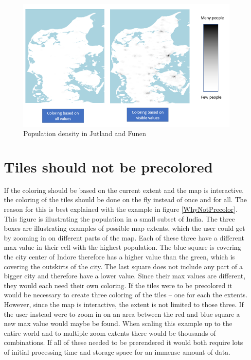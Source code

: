 \begin{figure} [H]
	\centering
	\includegraphics[width=.8\textwidth]{Pictures/WhyLimitToExtent}
	\caption{Population density in Jutland and Funen}
	\label{WhyLimitToExtent}
\end{figure}


\section{Tiles should not be precolored}
If the coloring should be based on the current extent and the map is interactive, the coloring of the tiles should be done on the fly instead of once and for all. The reason for this is best explained with the example in figure \ref{WhyNotPrecolor}. This figure is illustrating the population in a small subset of India.  The three boxes are illustrating examples of possible map extents, which the user could get by zooming in on different parts of the map. Each of these three have a different max value in their cell with the highest population. The blue square is covering the city center of Indore therefore has a higher value than the green, which is covering the outskirts of the city. The last square does not include any part of a bigger city and therefore have a lower value. 
Since their max values are different, they would each need their own coloring. If the tiles were to be precolored it would be necessary to create three coloring of the tiles – one for each the extents. However, since the map is interactive, the extent is not limited to those three. If the user instead were to zoom in on an area between the red and blue square a new max value would maybe be found. When scaling this example up to the entire world and to multiple zoom extents there would be thousands of combinations. If all of these needed to be prerendered it would both require lots of initial processing time and storage space for an immense amount of data. 



